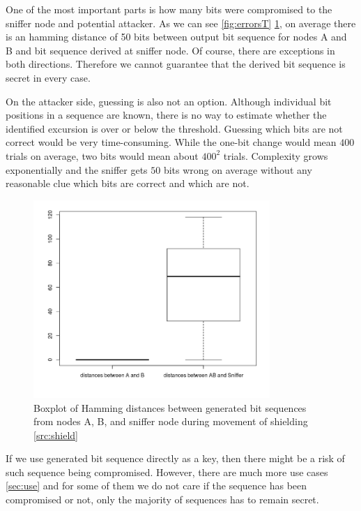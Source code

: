\documentclass[
  print, %
  Table,   %
  nolof,     %
  nolot,     %
           oneside
]{fithesis3}
\begin{document}
One of the most important parts is how many bits were compromised to the sniffer node and potential attacker. As we can see \ref{fig:errorsT} \ref{fig:errorsS}, on average there is an hamming distance of 50 bits between output bit sequence for nodes A and B and bit sequence derived at sniffer node. Of course, there are exceptions in both directions. Therefore we cannot guarantee that the derived bit sequence is secret in every case.

On the attacker side, guessing is also not an option. Although individual bit positions in a sequence are known, there is no way to estimate whether the identified excursion is over or below the threshold. Guessing which bits are not correct would be very time-consuming. While the one-bit change would mean $400$ trials on average, two bits would mean about $400^2$ trials. Complexity grows exponentially and the sniffer gets $50$ bits wrong on average without any reasonable clue which bits are correct and which are not.

\begin{figure}
    \vspace{-10pt}
  \includegraphics[width=0.8\textwidth]{../images/boxplotDistancesRottation.png}
  \vspace{-10pt}
\caption{Boxplot of Hamming distances between generated bit sequences from nodes A, B, and sniffer node during movement of shielding \ref{src:shield}}
\label{fig:errorsS}
\end{figure}

\clearpage
If we use generated bit sequence directly as a key, then there might be a risk of such sequence being compromised. However, there are much more use cases \ref{sec:use} and for some of them we do not care if the sequence has been compromised or not, only the majority of sequences has to remain secret.
\end{document}

